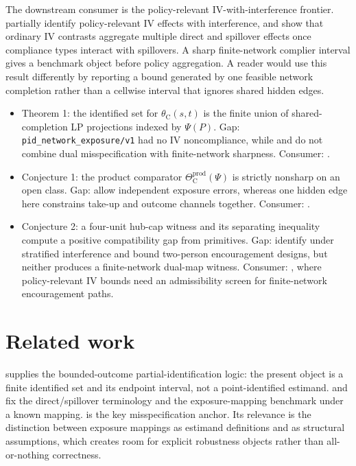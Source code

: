 \documentclass[11pt]{article}
\newcommand{\PsiObs}{\Psi}
\theoremstyle{definition}
\theoremstyle{plain}
\theoremstyle{remark}
\begin{document}
The downstream consumer is the policy-relevant IV-with-interference frontier.
\citet[Abstract]{NibberingOosterveen2025} partially identify policy-relevant IV
effects with interference, and \citet[Abstract]{VazquezBare2023} show that
ordinary IV contrasts aggregate multiple direct and spillover effects once
compliance types interact with spillovers. A sharp finite-network complier
interval gives a benchmark object before policy aggregation. A reader would use
this result differently by reporting a bound generated by one feasible network
completion rather than a cellwise interval that ignores shared hidden edges.

\begin{itemize}[leftmargin=*]
\item Theorem 1: the identified set for \(\theta_{\mathrm{C}}(s,t)\) is the
finite union of shared-completion LP projections indexed by \(\PsiObs(P)\). Gap:
\texttt{pid\_network\_exposure/v1} had no IV noncompliance, while
\citet{HoshinoYanagi2024} and \citet{SchroderOprescuFeuerriegelKallus2026} do
not combine dual misspecification with finite-network sharpness. Consumer:
\citet{NibberingOosterveen2025}.
\item Conjecture 1: the product comparator
\(\Theta_{\mathrm{C}}^{\mathrm{prod}}(\PsiObs)\) is strictly nonsharp on an
open class. Gap:
\citet{SchroderOprescuFeuerriegelKallus2026} allow independent exposure errors,
whereas one hidden edge here constrains take-up and outcome channels together.
Consumer: \citet{Savje2024}.
\item Conjecture 2: a four-unit hub-cap witness and its separating inequality
compute a positive compatibility gap from primitives. Gap:
\citet{ImaiJiangMalani2021} identify under stratified interference and
\citet{AcerenzaMartinezIriarteSanchezBecerraSpini2025} bound two-person
encouragement designs, but neither produces a finite-network dual-map witness.
Consumer: \citet{NibberingOosterveen2025}, where policy-relevant IV bounds need
an admissibility screen for finite-network encouragement paths.
\end{itemize}

\section{Related work}
\citet[reused from parent]{Manski1990} supplies the bounded-outcome
partial-identification logic: the present object is a finite identified set and
its endpoint interval, not a point-identified estimand. \citet[reused from
parent]{HudgensHalloran2008} and \citet[reused from parent]{AronowSamii2017}
fix the direct/spillover terminology and the exposure-mapping benchmark under a
known mapping. \citet[reused from parent]{Savje2024} is the key
misspecification anchor. Its relevance is the distinction between exposure
mappings as estimand definitions and as structural assumptions, which creates
room for explicit robustness objects rather than all-or-nothing correctness.
\end{document}

